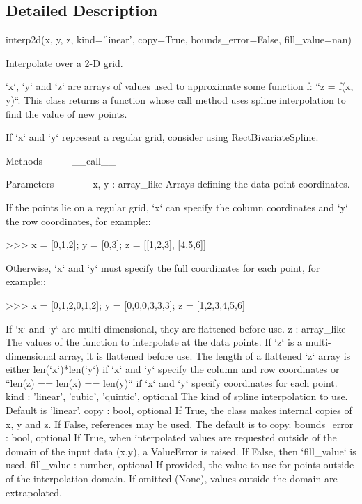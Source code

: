 \subsection{Detailed Description}
\begin{DoxyVerb}interp2d(x, y, z, kind='linear', copy=True, bounds_error=False,
         fill_value=nan)

Interpolate over a 2-D grid.

`x`, `y` and `z` are arrays of values used to approximate some function
f: ``z = f(x, y)``. This class returns a function whose call method uses
spline interpolation to find the value of new points.

If `x` and `y` represent a regular grid, consider using
RectBivariateSpline.

Methods
-------
__call__

Parameters
----------
x, y : array_like
    Arrays defining the data point coordinates.

    If the points lie on a regular grid, `x` can specify the column
    coordinates and `y` the row coordinates, for example::

      >>> x = [0,1,2];  y = [0,3]; z = [[1,2,3], [4,5,6]]

    Otherwise, `x` and `y` must specify the full coordinates for each
    point, for example::

      >>> x = [0,1,2,0,1,2];  y = [0,0,0,3,3,3]; z = [1,2,3,4,5,6]

    If `x` and `y` are multi-dimensional, they are flattened before use.
z : array_like
    The values of the function to interpolate at the data points. If
    `z` is a multi-dimensional array, it is flattened before use.  The
    length of a flattened `z` array is either
    len(`x`)*len(`y`) if `x` and `y` specify the column and row coordinates
    or ``len(z) == len(x) == len(y)`` if `x` and `y` specify coordinates
    for each point.
kind : {'linear', 'cubic', 'quintic'}, optional
    The kind of spline interpolation to use. Default is 'linear'.
copy : bool, optional
    If True, the class makes internal copies of x, y and z.
    If False, references may be used. The default is to copy.
bounds_error : bool, optional
    If True, when interpolated values are requested outside of the
    domain of the input data (x,y), a ValueError is raised.
    If False, then `fill_value` is used.
fill_value : number, optional
    If provided, the value to use for points outside of the
    interpolation domain. If omitted (None), values outside
    the domain are extrapolated.


\end{DoxyVerb}
